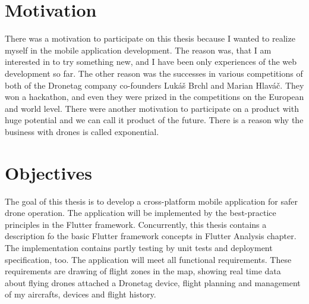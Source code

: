 \section{Motivation}\label{sec:motivation}
There was a motivation to participate on this thesis because I wanted to realize myself in the mobile application development. %
The reason was, that I am interested in to try something new, and I have been only experiences of the web development so far. %
The other reason was the successes in various competitions of both of the Dronetag company co-founders Luk{\' a}{\v s} Brchl and Marian Hlav{\' a}{\v c}. %
They won a hackathon, and even they were prized in the competitions on the European and world level. %
There were another motivation to participate on a product with huge potential and we can call it product of the future. %
There is a reason why the business with drones is called exponential.


\section{Objectives}\label{sec:objectives}
The goal of this thesis is to develop a cross-platform mobile application for safer drone operation.
The application will be implemented by the best-practice principles in the Flutter framework.
Concurrently, this thesis contains a description fo the basic Flutter framework concepts in Flutter Analysis chapter.
The implementation contains partly testing by unit tests and deployment specification, too.
The application will meet all functional requirements. %
These requirements are drawing of flight zones in the map, showing real time data about flying drones attached a Dronetag device, flight planning and management of my aircrafts, devices and flight history.
